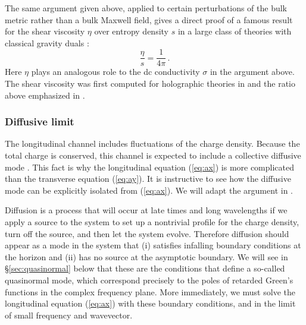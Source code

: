\documentclass[10pt, oneside]{book}
\def\be{\begin{equation}}
\def\ee{\end{equation}}
\begin{document}
\begin{doublespace}
The same argument given above, applied to certain perturbations of the bulk metric rather than a bulk Maxwell field, gives a direct proof of a famous result for the shear viscosity $\eta$ over entropy density $s$ in a large class of theories with classical gravity duals \cite{Iqbal:2008by}:
\be
\frac{\eta}{s} = \frac{1}{4 \pi} \,. 
\ee
Here $\eta$ plays an analogous role to the dc conductivity $\sigma$ in the argument above. The shear viscosity was first computed for holographic theories in \cite{Policastro:2001yc} and the ratio above emphasized in \cite{Kovtun:2003wp,Kovtun:2004de}.


\subsubsection{Diffusive limit}\label{sec:diffusive}

The longitudinal channel includes fluctuations of the charge density. Because the total charge is conserved, this channel is expected to include a collective diffusive mode \cite{Kadanoff1963419}. This fact is why the longitudinal equation (\ref{eq:ax}) is more complicated than the transverse equation (\ref{eq:ay}). It is instructive to see how the diffusive mode can be explicitly isolated from (\ref{eq:ax}). We will adapt the argument in \cite{Starinets:2008fb}.

Diffusion is a process that will occur at late times and long wavelengths if we apply a source to the system to set up a nontrivial profile for the charge density, turn off the source, and then let the system evolve. Therefore diffusion should appear as a mode in the system that (i) satisfies infalling boundary conditions at the horizon and (ii) has no source at the asymptotic boundary. We will see in \S\ref{sec:quasinormal} below that these are the conditions that define a so-called quasinormal mode, which correspond precisely to the poles of retarded Green's functions in the complex frequency plane. More immediately, we must solve the longitudinal equation (\ref{eq:ax}) with these boundary conditions, and in the limit of small frequency and wavevector.


\end{doublespace}
\end{document}
